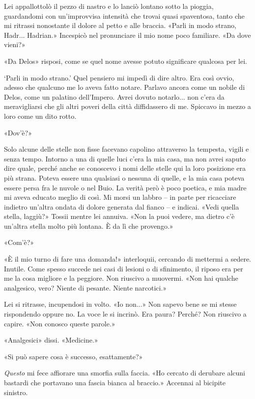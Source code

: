 Lei appallottolò il pezzo di nastro e lo lanciò lontano sotto la
pioggia, guardandomi con un'improvvisa intensità che trovai quasi
spaventosa, tanto che mi ritrassi nonostante il dolore al petto e alle
braccia. «Parli in modo strano, Hadr... Hadrian.» Incespicò nel
pronunciare il mio nome poco familiare. «Da dove vieni?»

«Da Delos» risposi, come se quel nome avesse potuto significare qualcosa
per lei.

`Parli in modo strano.' Quel pensiero mi impedì di dire altro. Era così
ovvio, adesso che qualcuno me lo aveva fatto notare. Parlavo ancora come
un nobile di Delos, come un palatino dell'Impero. Avrei dovuto
notarlo... non c'era da meravigliarsi che gli altri poveri della città
diffidassero di me. Spiccavo in mezzo a loro come un dito rotto.

«Dov'è?»

Solo alcune delle stelle non fisse facevano capolino attraverso la
tempesta, vigili e senza tempo. Intorno a una di quelle luci c'era la
mia casa, ma non avrei saputo dire quale, perché anche se conoscevo i
nomi delle stelle qui la loro posizione era più strana. Poteva essere
una qualsiasi o nessuna di quelle, e la mia casa poteva essere persa fra
le nuvole o nel Buio. La verità però è poco poetica, e mia madre mi
aveva educato meglio di così. Mi morsi un labbro -- in parte per
ricacciare indietro un'altra ondata di dolore generata dal fianco -- e
indicai. «Vedi quella stella, laggiù?» Tossii mentre lei annuiva. «Non
la puoi vedere, ma dietro c'è un'altra stella molto più lontana. È da lì
che provengo.»

«Com'è?»

«È il mio turno di fare una domanda!» interloquii, cercando di mettermi
a sedere. Inutile. Come spesso succede nei casi di lesioni o di
sfinimento, il riposo era per me la cosa migliore e la peggiore. Non
riuscivo a muovermi. «Non hai qualche analgesico, vero? Niente di
pesante. Niente narcotici.»

Lei si ritrasse, incupendosi in volto. «Io non...» Non sapevo bene se mi
stesse rispondendo oppure no. La voce le si incrinò. Era paura? Perché?
Non riuscivo a capire. «Non conosco queste parole.»

«Analgesici» dissi. «Medicine.»

«Si può sapere cosa è successo, esattamente?»

\emph{Questo} mi fece affiorare una smorfia sulla faccia. «Ho cercato di
derubare alcuni bastardi che portavano una fascia bianca al braccio.»
Accennai al bicipite sinistro.

